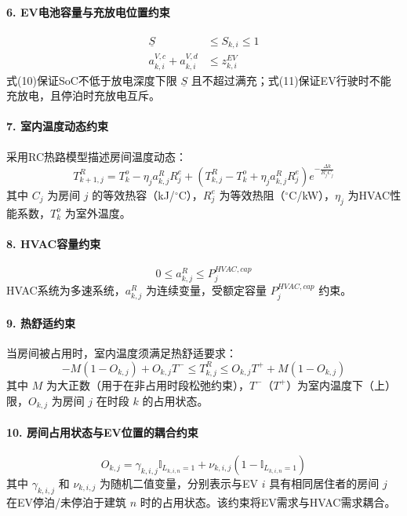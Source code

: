 \documentclass[11pt]{ctexart}
\begin{document}
\paragraph{6. EV电池容量与充放电位置约束}
\begin{align}
    \underline{S} &\le S_{k,i} \le 1 \\
    a_{k,i}^{V,c} + a_{k,i}^{V,d} &\le z_{k,i}^{EV}
\end{align}
式(10)保证SoC不低于放电深度下限 $\underline{S}$ 且不超过满充；式(11)保证EV行驶时不能充放电，且停泊时充放电互斥。

\paragraph{7. 室内温度动态约束}
采用RC热路模型描述房间温度动态：
\begin{equation}
    T_{k+1,j}^R = T_k^o - \eta_j a_{k,j}^R R_j^e + \left( T_{k,j}^R - T_k^o + \eta_j a_{k,j}^R R_j^e \right) e^{-\frac{\Delta k}{R_j^e C_j}}
\end{equation}
其中 $C_j$ 为房间 $j$ 的等效热容（kJ/$^\circ$C），$R_j^e$ 为等效热阻（$^\circ$C/kW），$\eta_j$ 为HVAC性能系数，$T_k^o$ 为室外温度。

\paragraph{8. HVAC容量约束}
\begin{equation}
    0 \le a_{k,j}^R \le P_j^{HVAC,cap}
\end{equation}
HVAC系统为多速系统，$a_{k,j}^R$ 为连续变量，受额定容量 $P_j^{HVAC,cap}$ 约束。

\paragraph{9. 热舒适约束}
当房间被占用时，室内温度须满足热舒适要求：
\begin{equation}
    -M(1 - O_{k,j}) + O_{k,j} T^- \le T_{k,j}^R \le O_{k,j} T^+ + M(1 - O_{k,j})
\end{equation}
其中 $M$ 为大正数（用于在非占用时段松弛约束），$T^-$（$T^+$）为室内温度下（上）限，$O_{k,j}$ 为房间 $j$ 在时段 $k$ 的占用状态。

\paragraph{10. 房间占用状态与EV位置的耦合约束}
\begin{equation}
    O_{k,j} = \gamma_{k,i,j} \mathbb{I}_{L_{k,i,n}=1} + \nu_{k,i,j} (1 - \mathbb{I}_{L_{k,i,n}=1})
\end{equation}
其中 $\gamma_{k,i,j}$ 和 $\nu_{k,i,j}$ 为随机二值变量，分别表示与EV $i$ 具有相同居住者的房间 $j$ 在EV停泊/未停泊于建筑 $n$ 时的占用状态。该约束将EV需求与HVAC需求耦合。
\end{document}
